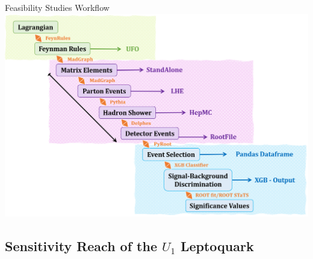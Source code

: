 \documentclass{../bredelebeamer}
\begin{document}
	

\begin{frame}{Feasibility Studies Workflow}
	\includegraphics[width=1.0\linewidth]{../2023_paper/Workflow.png}
\end{frame}


\subsection{Sensitivity Reach of the $U_1$ Leptoquark}
\end{document}

